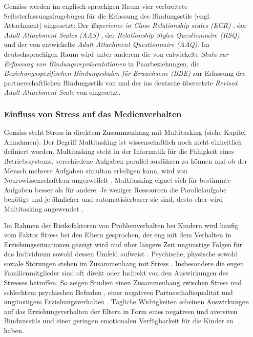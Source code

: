 Gemäss  werden im englisch sprachigen Raum vier verbreitete Selbsterfassungsfragebögen für die Erfassung des Bindungsstils (engl. Attachment) eingesetzt: Der \textit{
Experience in Close Relationship scales (ECR)} \cite{Brennan1998}, der \textit{Adult Attachment Scales (AAS)} \cite{Collins1990}, der \textit{Relationship Styles Questionnaire (RSQ)} \cite{Griffin1994} und der von  entwickelte \textit{Adult Attachment Questionnaire (AAQ)}. Im deutschsprachigen Raum wird unter anderem die von  entwickelte \textit{Skala zur Erfassung von Bindungsrepräsentationen} in Paarbeziehungen, die \textit{Beziehungsspezifischen Bindungsskalen für Erwachsene (BBE)} zur Erfassung des partnerschaftlichen Bindungsstils von  und der ins deutsche übersetzte \textit{Revised Adult Attachment Scale} von  eingesetzt. 

\subsubsection{Einfluss von Stress auf das Medienverhalten}
Gemäss  steht Stress in direktem Zusammenhang mit Multitasking (siehe Kapitel Annahmen). Der Begriff Multitasking ist wissenschaftlich noch nicht einheitlich definiert worden. Multitasking steht in der Informatik für die Fähigkeit eines Betriebssystems, verschiedene Aufgaben parallel ausführen zu können  und ob der Mensch mehrere Aufgaben simultan erledigen kann, wird von Neurowissenschaftlern angezweifelt \cite{Zimber2016}. Multitasking eignet sich für bestimmte Aufgaben besser als für andere. Je weniger Ressourcen die Parallelaufgabe benötigt und je ähnlicher und automatisierbarer sie sind, desto eher wird Multitasking angewendet \cite[S.~10]{Zimber2016}.

Im Rahmen der Risikofaktoren von Problemverhalten bei Kindern wird häufig vom Faktor Stress bei den Eltern gesprochen, der eng mit dem Verhalten in Erziehungssituationen gezeigt wird und über längere Zeit ungünstige Folgen für das Individuum sowohl dessen Umfeld aufweist \cite{Cina2009}. Psychische, physische sowohl soziale Störungen stehen im Zusammenhang mit Stress \cite{Elfering2002, Burisch1994}. Insbesondere die engen Familienmitglieder sind oft direkt oder Indirekt von den Auswirkungen des Stresses betroffen. So zeigen Studien einen Zusammenhang zwischen Stress und schlechtem psychischen Befinden \cite{Burisch1994, Krohne1997}, einer negativen Partneschaftsqualität \cite{Bodenmann2000, Bodenmann1999, Bodenmann2000a} und ungünstigem Erziehungsverhalten \cite{Abidin1992, Belsky1984, WebsterStratton2000}. Tägliche Widrigkeiten scheinen Auswirkungen auf das Erziehungsverhalten der Eltern in Form eines negativen und aversiven Bindunsstils \cite{Dumas1989, Webster-Stratton1988} und einer geringen emotionalen Verfügbarkeit für die Kinder \cite{Campbell1991} zu haben.

